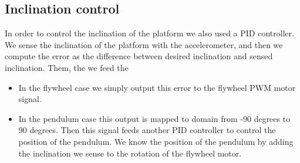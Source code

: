 \subsection{Inclination control}
In order to control the inclination of the platform we also used a PID controller.
We sense the inclination of the platform with the accelerometer, and then we compute the error
as the difference between desired inclination and sensed inclination. Them, the we feed the 

\begin{itemize}
    \item In the flywheel case we simply output this error to the flywheel PWM motor signal.
    \item In the pendulum case this output is mapped to domain from -90 degrees to 90 degrees.
    Then this signal feeds another PID controller to control the position of the pendulum. We know
    the position of the pendulum by adding the inclination we sense to the rotation of the flywheel motor.
\end{itemize}
